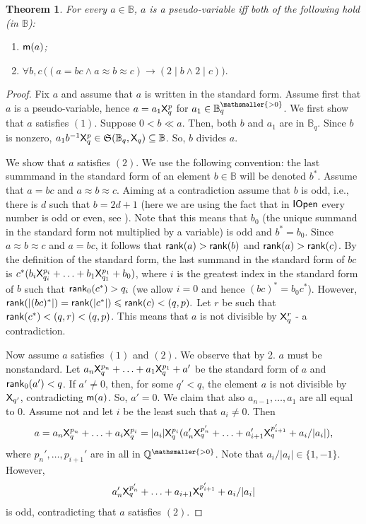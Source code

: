\documentclass{amsart}
\renewcommand{\leq}{\leqslant}
\newtheorem{theorem}{Theorem}[section]
\newcommand{\X}{{\sf X}}
\newcommand{\iopen}{{\sf IOpen}}
\newcommand{\QS}{\mathbb{B}}
\newcommand{\m}{{\sf m}}
\newcommand{\shef}{\mathfrak{S}}
\begin{document}
\begin{theorem}
    For every $a\in \QS$, $a$ is a pseudo-variable iff both of the following hold \textup(in $\QS$\textup):
    \begin{enumerate}[$1$.]
        \item $\m(a)$;
        \item $\forall b,c\, \bigl((a=bc \wedge a\approx b\approx c)\rightarrow (2\mid b\wedge 2\mid c)\bigr).$  
    \end{enumerate}
\end{theorem}

\begin{proof}
    Fix $a$ and assume that $a$ is written in the standard form.
    Assume first that $a$ is a pseudo-variable, hence $a = a_1\X^{p}_q$ for $a_1\in \QS_q^{\mathsmaller{> 0}}$. We first show that
    $a$ satisfies $(1)$.  Suppose 
    $0< b\ll a$. Then, both  $b$ and $a_1$ are in $\QS_q$. Since $b$ is nonzero, 
    $a_1b^{-1}\X_q^p\in \shef(\mathbb{B}_q, \X_q)\subseteq \mathbb{B}$. 
    So, $b$ divides $a$. 
    
    We show that $a$ satisfies $(2)$. We use the following convention: the last summmand in the standard form of an element $b\in\mathbb{B}$ will be denoted $b^*$. Assume that $a = bc$ and $a\approx b\approx c$. Aiming at a contradiction assume that $b$ is odd, i.e., there is $d$ such that $b=2d+1$ (here we are using the fact that in $\iopen$ every number is odd or even, see \cite[Chapter I, Lemma 1.17]{haje:meta91}). Note that this means that $b_0$ (the unique summand in the standard form not multiplied by a variable) is odd and $b^*=b_0$. Since $a\approx b\approx c$ and $a=bc$, it follows that ${\sf rank}(a)>{\sf rank}(b)$ and ${\sf rank}(a)>{\sf rank}(c)$. By the definition of the standard form, the last summand in the standard form of $bc$ is $c^*(b_i\X^{p_i}_{q_i} + \ldots +b_1\X^{p_1}_{q_1} +b_0)$, where $i$ is the greatest index in the standard form of $b$ such that ${\sf rank}_0(c^*)>q_i$ (we allow $i=0$ and hence $(bc)^* = b_0c^*$). However, ${\sf rank}(|(bc)^*|) = {\sf rank}(|c^*|) \leq {\sf rank}(c)<(q,p).$ Let $r$ be such that ${\sf rank}(c^*)<(q,r)<(q,p)$. This means that $a$ is not divisible by $\X^r_q$ - a contradiction.

    Now assume $a$ satisfies $(1)$ and $(2)$. We observe that by 2. $a$ must be nonstandard. Let $a_n\X_q^{p_n} + \ldots + a_1\X_q^{p_1} + a'$ 
    be the standard form of $a$ and ${\sf rank}_0(a')<q$.  If $a'\neq 0$, then, for some $q'<q$, the element $a$ is not divisible by $\X_{q'}$, 
    contradicting $\m(a)$. So, $a' = 0$. We claim that also $a_{n-1}, \ldots, a_1$ are all equal to $0$. 
    Assume not and let $i$ be the least such that $a_i\neq 0$. Then
    \[a=a_n\X_q^{p_n} + \ldots + a_i\X_q^{p_i} = |a_i|\X_q^{p_i}(a_n'\X_q^{p_n'} + \ldots +a_{i+1}'\X_q^{p_{i+1}'} +a_i/|a_i|),\]
    where $p_n',\ldots, p_{i+1}'$ are in all in $\mathbb{Q}^{\mathsmaller{> 0}}$. Note that $a_i/|a_i|\in\{1,-1\}$.
    However, $$a_n'\X_q^{p_n'} + \ldots +a_{i+1}\X_q^{p_{i+1}'} +a_i/|a_i|$$ is odd, 
    contradicting that $a$ satisfies $(2)$.
\end{proof}
\end{document}

